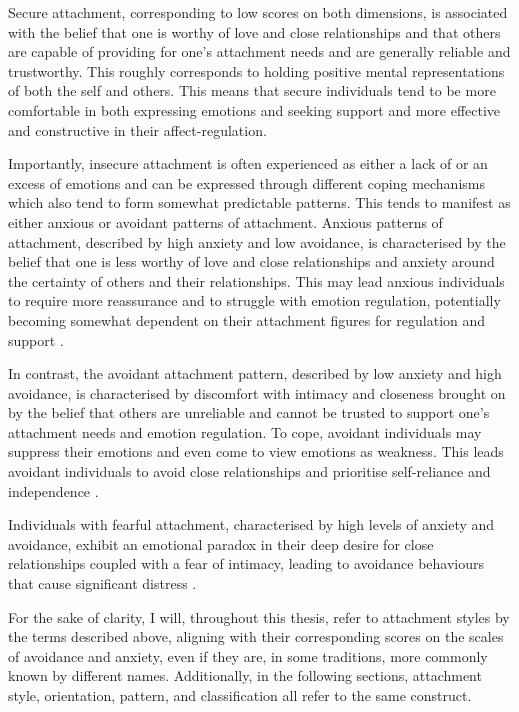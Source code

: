 \documentclass[12pt]{report}
\begin{document}
Secure attachment, corresponding to low scores on both dimensions, is associated with the belief that one is worthy of love and close relationships and that others are capable of providing for one's attachment needs and are generally reliable and trustworthy.
This roughly corresponds to holding positive mental representations of both the self and others.
This means that secure individuals tend to be more comfortable in both expressing emotions and seeking support and more effective and constructive in their affect-regulation.

Importantly, insecure attachment is often experienced as either a lack of or an excess of emotions and can be expressed through different coping mechanisms which also tend to form somewhat predictable patterns.
This tends to manifest as either anxious or avoidant patterns of attachment. Anxious patterns of attachment, described by high anxiety and low avoidance, is characterised by the belief that one is less worthy of love and close relationships and anxiety around the certainty of others and their relationships.
This may lead anxious individuals to require more reassurance and to struggle with emotion regulation, potentially becoming somewhat dependent on their attachment figures for regulation and support .

In contrast, the avoidant attachment pattern, described by low anxiety and high avoidance, is characterised by discomfort with intimacy and closeness brought on by the belief that others are unreliable and cannot be trusted to support one's attachment needs and emotion regulation.
To cope, avoidant individuals may suppress their emotions and even come to view emotions as weakness.
This leads avoidant individuals to avoid close relationships and prioritise self-reliance and independence \cite{Mikulincer2013,Hudson2020}.

Individuals with fearful attachment, characterised by high levels of anxiety and avoidance, exhibit an emotional paradox in their deep desire for close relationships coupled with a fear of intimacy, leading to avoidance behaviours that cause significant distress \cite{Bartholomew1991}.

For the sake of clarity, I will, throughout this thesis, refer to attachment styles by the terms described above, aligning with their corresponding scores on the scales of avoidance and anxiety, even if they are, in some traditions, more commonly known by different names.
Additionally, in the following sections, attachment style, orientation, pattern, and classification all refer to the same construct.
\end{document}
